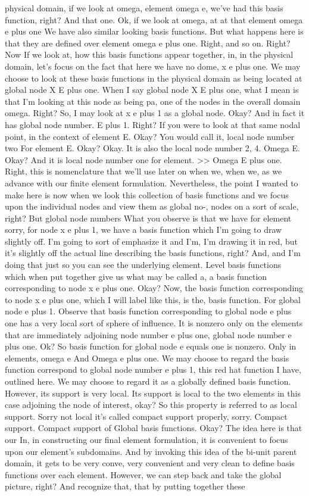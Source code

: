 \documentclass[10pt]{article}
\begin{document}
physical domain, if we look at omega, element omega e, we've had this basis function, right? And that one. Ok, if we look at omega, at at that element omega e plus one We have also similar looking basis functions. But what happens here is that they are defined over element omega e plus one. Right, and so on. Right? Now If we look at, how this basis functions appear together, in, in the physical domain, let's focus on the fact that here we have no dome, x e plus one. We may choose to look at these basis functions in the physical domain as being located at global node X E plus one. When I say global node X E plus one, what I mean is that I'm looking at this node as being pa, one of the nodes in the overall domain omega. Right? So, I may look at x e plus 1 as a global node. Okay? And in fact it has global node number. E plus 1. Right? If you were to look at that same nodal point, in the context of element E. Okay? You would call it, local node number two For element E. Okay? Okay. It is also the local node number 2, 4. Omega E. Okay? And it is local node number one for element. >> Omega E plus one. Right, this is nomenclature that we'll use later on when we, when we, as we advance with our finite element formulation. Nevertheless, the point I wanted to make here is now when we look this collection of basis functions and we focus upon the individual nodes and view them as global no-, nodes on a sort of scale, right? But global node numbers What you observe is that we have for element sorry, for node x e plus 1, we have a basis function which I'm going to draw slightly off. I'm going to sort of emphasize it and I'm, I'm drawing it in red, but it's slightly off the actual line describing the basis functions, right? And, and I'm doing that just so you can see the underlying element. Level basis functions which when put together give us what may be called a, a basis function corresponding to node x e plus one. Okay? Now, the basis function corresponding to node x e plus one, which I will label like this, is the, basis function. For global node e plus 1. Observe that basis function corresponding to global node e plus one has a very local sort of sphere of influence. It is nonzero only on the elements that are immediately adjoining node number e plus one, global node number e plus one. Ok? So basis function for global node e equals one is nonzero. Only in elements, omega e And Omega e plus one. We may choose to regard the basis function correspond to global node number e plus 1, this red hat function I have, outlined here. We may choose to regard it as a globally defined basis function. However, its support is very local. Its support is local to the two elements in this case adjoining the node of interest, okay? So this property is referred to as local support. Sorry not local it's called compact support properly, sorry. Compact support. Compact support of Global basis functions. Okay? The idea here is that our In, in constructing our final element formulation, it is convenient to focus upon our element's subdomains. And by invoking this idea of the bi-unit parent domain, it gets to be very conve, very convenient and very clean to define basis functions over each element. However, we can step back and take the global picture, right? And recognize that, that by putting together these 
\end{document}
